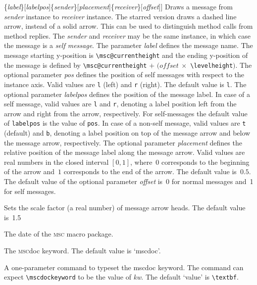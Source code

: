 \documentclass[a4paper]{article}
\newcommand{\cmd}[1]{\texttt{\bslash #1}}
\newcommand{\acro}[1]{{\scshape\lowercase{#1}}}
\newcommand\MSC{\acro{MSC}}
\newcommand{\MSCdoc}{\MSC{}doc}
\newcommand{\mscpack}{\MSC{} macro package}
\newcommand{\opt}[1]{[#1]}
\newenvironment{defs}{%
  \begin{list}{}%
              {\setlength{\labelwidth}{0pt}%
               \setlength{\labelsep}{1em}%
               \setlength{\leftmargin}{1em}%
               \setlength{\parsep}{1ex}%
               \setlength{\listparindent}{0pt}%
               \setlength{\rightmargin}{0pt}%
               \renewcommand{\makelabel}[1]{##1}%
               \raggedright%
              }%
  }{%
  \end{list}}
\begin{document}
\begin{defs}
\item[\cmd{mess(*)}\opt{\emph{pos}}\{\emph{label}\}\opt{\emph{labelpos}}\{\emph{sender}\}\opt{\emph{placement}}\{\emph{receiver}\}\opt{\emph{offset}}]
Draws a message from \emph{sender} instance to \emph{receiver}
instance. The starred version draws a dashed line arrow, instead of a
solid arrow. This can be used to distinguish method calls from method
replies.  The \emph{sender} and \emph{receiver} may be the same
instance, in which case the message is a \emph{self message}. The
parameter \emph{label} defines the message name. The message starting
y-position is \verb|\msc@currentheight| and the ending y-position of
the message is defined by \verb|\msc@currentheight| $+$
$(\textit{offset}\ \times $ \verb|\levelheight|$)$.  The optional
parameter \emph{pos} defines the position of self messages with
respect to the instance axis. Valid values are \verb+l+ (left) and
\verb+r+ (right). The default value is \verb+l+.  The optional
parameter \emph{labelpos} defines the position of the message
label. In case of a self message, valid values are \verb|l| and
\verb|r|, denoting a label position left from the arrow and right from
the arrow, respectively. For self-messages the default value of
\verb+labelpos+ is the value of \verb+pos+. In case of a non-self
message, valid values are \verb|t| (default) and \verb|b|, denoting a
label position on top of the message arrow and below the message
arrow, respectively.  The optional parameter \emph{placement} defines
the relative position of the message label along the message
arrow. Valid values are real numbers in the closed interval $[0,1]$,
where~$0$ corresponds to the beginning of the arrow and~$1$
corresponds to the end of the arrow. The default value is~$0.5$.  The
default value of the optional parameter \emph{offset} is~0 for normal
messages and~1 for self messages.

\item[\cmd{messarrowscale}\{\emph{scalefactor}\}] Sets the scale
factor (a real number) of message arrow heads. The default value
is~1.5

\item[\cmd{mscdate}] The date of the \mscpack.


\item[\cmd{mscdockeyword}] The \MSCdoc{} keyword. The default value is `mscdoc'.

\item[\cmd{mscdockeywordstyle}\{\emph{kw}\}] A one-parameter command to
typeset the mscdoc keyword. The command can expect \verb|\mscdockeyword| to
be the value of \emph{kw}. The default `value' is \verb|\textbf|.




\end{defs}
\end{document}
